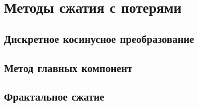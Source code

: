 \section{Методы сжатия с потерями}

\subsection{Дискретное косинусное преобразование}

\subsection{Метод главных компонент}

\subsection{Фрактальное сжатие}